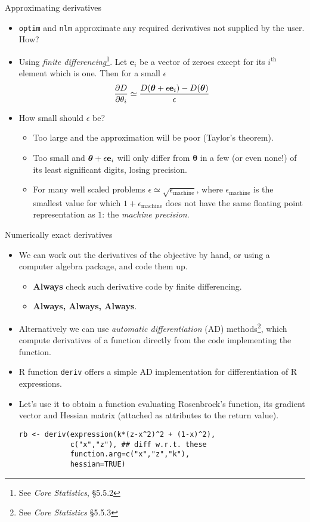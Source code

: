 \documentclass{beamer}
\newcommand{\pdif}[2]{\frac{\partial #1}{\partial #2}}
\begin{document}
\begin{frame}{Approximating derivatives}
\begin{itemize}
\item {\tt optim} and {\tt nlm} approximate any required derivatives not supplied by the user. How?
\item Using {\em finite differencing}\footnote{See {\em Core Statistics}, \S5.5.2}. Let ${\bm e}_i$ be a vector of zeroes except for its $i^\text{th}$ element which is one. Then for a small $\epsilon$
$$
\pdif{D}{\theta_i} \simeq \frac{D({\bm \theta} + \epsilon {\bf e}_i) - D({\bm \theta})}{\epsilon}
$$ 
\item How small should $\epsilon$ be?
\begin{itemize}
\item Too large and the approximation will be poor (Taylor's theorem).
\item Too small and ${\bm \theta} + \epsilon {\bf e}_i$ will only differ from ${\bm \theta}$ in a few (or even none!) of its least significant digits, losing precision.
\item For many well scaled problems $\epsilon \simeq \sqrt{\epsilon_{\text{machine}}}$, where $\epsilon_{\text{machine}}$ is the smallest value for which $1 + \epsilon_{\text{machine}}$ does not have the same floating point representation as $1$: the {\em  machine precision}.
\end{itemize}
\end{itemize}
\end{frame}

\begin{frame}[fragile]{Numerically exact derivatives}
\begin{itemize}
\item We can work out the derivatives of the objective by hand, or using a computer algebra package, and code them up. 
\begin{itemize}
\item {\bf Always} check such derivative code by finite differencing.
\item {\bf Always, Always, Always}.
\end{itemize}
\item Alternatively we can use {\em automatic differentiation} (AD) methods\footnote{See {\em Core Statistics} \S5.5.3}, which compute derivatives of a function directly from the code implementing the function. 
\item R function {\tt deriv} offers a simple AD implementation for differentiation of R expressions.
\item Let's use it to obtain a function evaluating Rosenbrock's function, its gradient vector and Hessian matrix (attached as attributes to the return value).
{\small \begin{verbatim}
rb <- deriv(expression(k*(z-x^2)^2 + (1-x)^2),
            c("x","z"), ## diff w.r.t. these
            function.arg=c("x","z","k"), 
            hessian=TRUE)
\end{verbatim}}
\end{itemize}
\end{frame}
\end{document}
